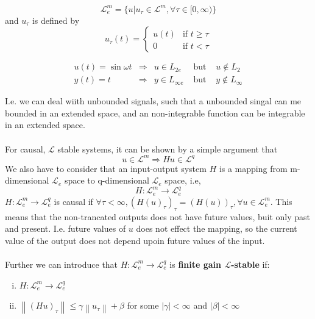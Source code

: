 \documentclass{article}
\begin{document}
\begin{equation}
	\mathcal{L}_e^m =\{u | u_\tau \in \mathcal{L}^{m}, \forall \tau \in [0, \infty )\}
\end{equation}
and $u_\tau$ is defined by
\begin{equation}
	u_\tau (t) = \begin{cases}
		u(t) & \text{if } t \geq \tau \\
		0 & \text{if } t < \tau
	\end{cases}
\end{equation}
\begin{frm-ex}
	\begin{equation*}
		\begin{array}{lllll}
			u(t)=\sin \omega t & \Rightarrow & u \in L_{2 e} & \text { but } & u \notin L_2 \\
			y(t)=t & \Rightarrow & y \in L_{\infty e} & \text { but } & y \notin L_{\infty}
		\end{array}
	\end{equation*}
\end{frm-ex}
I.e. we can deal wiith unbounded signals, such that a unbounded singal can me bounded in an extended space, and an non-integrable function can be integrable in an extended space.
\\\\
For causal, $\mathcal{L}$ stable systems, it can be shown by a simple argument that
\begin{equation}
	u \in \mathcal{L}^{m} \Rightarrow H u \in \mathcal{L}^{q}
\end{equation}
We also have to consider that an input-output system $H$ is a mapping from m-dimensional $\mathcal{L}_e$ space to q-dimensional $\mathcal{L}_e$ space, i.e,
\begin{equation}
	H: \mathcal{L}_e^m \rightarrow \mathcal{L}_e^q
\end{equation}
$H: \mathcal{L}_e^m \rightarrow \mathcal{L}_e^q$ is causal if $\forall \tau  < \infty, (H(u)_\tau)_\tau = (H(u))_\tau, \forall u \in \mathcal{L}_e^{m}$. This means that the non-trancated outputs does not have future values, buit only past and present. I.e. future values of $u$ does not effect the mapping, so the current value of the output does not depend upoin future values of the input.
\\\\
Further we can introduce that $H:\mathcal{L}_e^m \rightarrow \mathcal{L}_e^{q}$ is \textbf{finite gain $\mathcal{L}$-stable} if:
\begin{enumerate}[(i)]
	\item $H:\mathcal{L}_e^{m}\rightarrow \mathcal{L}_e^{q}$ 
	\item $\left\| (Hu)_\tau  \right\| \leq \gamma  \left\| u_\tau  \right\| + \beta$ for some $\left| \gamma  \right| < \infty $ and $\left| \beta  \right| < \infty $   
\end{enumerate} 
\end{document}
